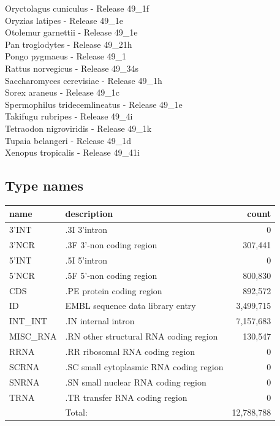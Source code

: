\documentclass{article}
\begin{document}
\begin{Schunk}
 Oryctolagus cuniculus - Release 49\_1f \\
 Oryzias latipes - Release 49\_1e \\
 Otolemur garnettii - Release 49\_1e \\
 Pan troglodytes - Release 49\_21h \\
 Pongo pygmaeus - Release 49\_1 \\
 Rattus norvegicus - Release 49\_34s \\
 Saccharomyces cerevisiae - Release 49\_1h \\
 Sorex araneus - Release 49\_1c \\
 Spermophilus tridecemlineatus - Release 49\_1e \\
 Takifugu rubripes - Release 49\_4i \\
 Tetraodon nigroviridis - Release 49\_1k \\
 Tupaia belangeri - Release 49\_1d \\
 Xenopus tropicalis - Release 49\_41i \\


\subsection{Type names}
\noindent\begin{tabular}{llr}
\hline \hline
name & description & count \\
\hline
3'INT  &  .3I 3'intron  &  0 \\
3'NCR  &  .3F  3'-non coding region  &  307,441 \\
5'INT  &  .5I 5'intron  &  0 \\
5'NCR  &  .5F  5'-non coding region  &  800,830 \\
CDS  &  .PE protein coding region  &  892,572 \\
ID  &  EMBL sequence data library entry  &  3,499,715 \\
INT\_INT  &  .IN  internal intron  &  7,157,683 \\
MISC\_RNA  &  .RN other structural RNA coding region  &  130,547 \\
RRNA  &  .RR ribosomal RNA coding region  &  0 \\
SCRNA  &  .SC small cytoplasmic RNA coding region  &  0 \\
SNRNA  &  .SN small nuclear RNA coding region  &  0 \\
TRNA  &  .TR transfer RNA coding region  &  0 \\
\hline
 & Total: & 12,788,788 \\
\hline \hline
\end{tabular}


\end{Schunk}
\end{document}

